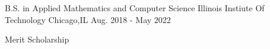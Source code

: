 

\begin{cventries}

  \cventry
    {B.S. in Applied Mathematics and Computer Science} %
    {Illinois Instiute Of Technology} %
    {Chicago,IL} %
    {Aug. 2018 - May 2022} %
    {
      \begin{cvitems} %
        \item {Merit Scholarship}
      \end{cvitems}
    }

\end{cventries}